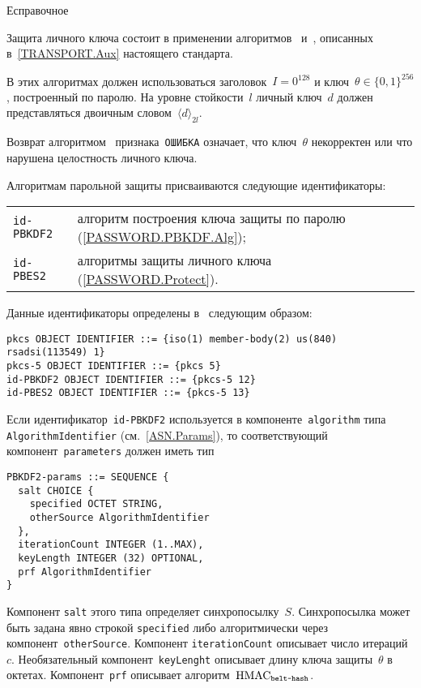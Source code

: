 \begin{appendix}{Е}{справочное}
\label{PASSWORD.Protect}

Защита личного ключа состоит в применении алгоритмов~ 
и~, описанных в~\ref{TRANSPORT.Aux}
настоящего стандарта.

В этих алгоритмах должен использоваться заголовок~$I=0^{128}$
и ключ~$\theta\in\{0,1\}^{256}$, построенный по паролю.
На уровне стойкости~$l$ личный ключ~$d$ должен представляться 
двоичным словом~$\langle d\rangle_{2l}$.

Возврат алгоритмом~ признака~\texttt{ОШИБКА}  
означает, что ключ~$\theta$ некорректен
или что нарушена целостность личного ключа.

\label{PASSWORD.Ids}

Алгоритмам парольной защиты присваиваются следующие идентификаторы:
\begin{center}
\begin{tabular}{p{4cm}p{12cm}}
\texttt{id-PBKDF2} &
алгоритм построения ключа защиты по паролю (\ref{PASSWORD.PBKDF.Alg});\\
%
\texttt{id-PBES2} &
алгоритмы защиты личного ключа (\ref{PASSWORD.Protect}).\\
\end{tabular}
\end{center}

Данные идентификаторы определены в~\cite{PKCS5}
следующим образом:
\begin{verbatim}
pkcs OBJECT IDENTIFIER ::= {iso(1) member-body(2) us(840) rsadsi(113549) 1}
pkcs-5 OBJECT IDENTIFIER ::= {pkcs 5}
id-PBKDF2 OBJECT IDENTIFIER ::= {pkcs-5 12}
id-PBES2 OBJECT IDENTIFIER ::= {pkcs-5 13}
\end{verbatim}

Если идентификатор~\texttt{id-PBKDF2} используется в
компоненте~\texttt{algorithm} типа \texttt{AlgorithmIdentifier}
(см.~\ref{ASN.Params}),
то соответствующий компонент~\texttt{parameters} должен иметь тип
\begin{verbatim}
PBKDF2-params ::= SEQUENCE {
  salt CHOICE {
    specified OCTET STRING,
    otherSource AlgorithmIdentifier
  },
  iterationCount INTEGER (1..MAX),
  keyLength INTEGER (32) OPTIONAL,
  prf AlgorithmIdentifier
}
\end{verbatim}

Компонент \texttt{salt} этого типа определяет синхропосылку~$S$.
Синхропосылка может быть задана явно строкой \texttt{specified}
либо алгоритмически через компонент~\texttt{otherSource}.
%
Компонент \texttt{iterationCount} описывает число итераций~$c$.
%
Необязательный компонент~\texttt{keyLenght} 
описывает длину ключа защиты~$\theta$ в октетах.
%
Компонент~\texttt{prf} описывает алгоритм~$\text{\normalfont HMAC}_{\texttt{belt-hash}}$.


\end{appendix}
